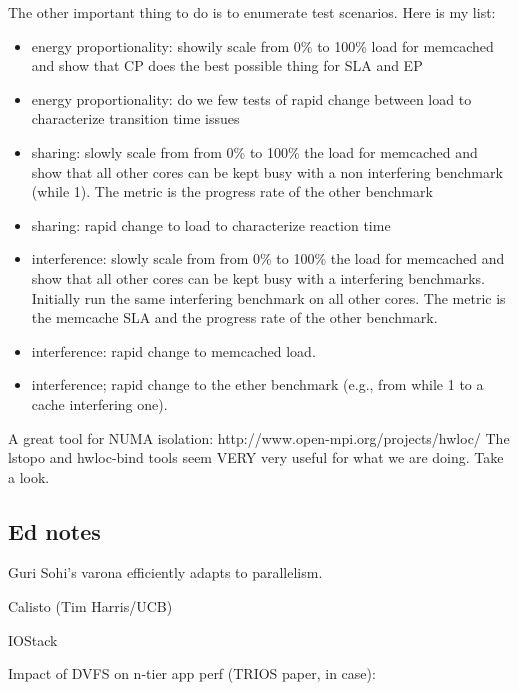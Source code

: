The other important thing to do is to enumerate test scenarios. Here is my list:
\begin{itemize}

\item energy proportionality: showily scale from 0\% to 100\% load for
  memcached and show that CP does the best possible thing for SLA and
  EP

\item energy proportionality: do we few tests of rapid change between load to characterize transition time issues
\item  sharing: slowly scale from from 0\% to 100\% the load for memcached and show that all other cores can be kept busy with a non interfering benchmark (while 1). The metric is the progress rate of the other benchmark

\item sharing: rapid change to load to characterize reaction time

\item interference: slowly scale from from 0\% to 100\% the load for memcached and show that all other cores can be kept busy with a interfering benchmarks. Initially run the same interfering benchmark on all other cores. The metric is the memcache SLA and the progress rate of the other benchmark. 

\item interference: rapid change to memcached load. 
\item interference; rapid change to the ether benchmark (e.g., from while 1 to a cache interfering one). 
\end{itemize}


A great tool for NUMA isolation: 
http://www.open-mpi.org/projects/hwloc/
The lstopo and hwloc-bind tools seem VERY very useful for what we are doing. Take a look. 


\subsection{Ed notes}


Guri Sohi's varona\cite{DBLP:conf/pldi/SridharanGS14} efficiently adapts to parallelism.

Calisto (Tim Harris/UCB) \cite{DBLP:conf/eurosys/HarrisMM14}

IOStack \cite{DBLP:conf/usenix/ShalevSBB10}

Impact of DVFS on n-tier app perf (TRIOS paper, in case): \cite{wang2013impact}



